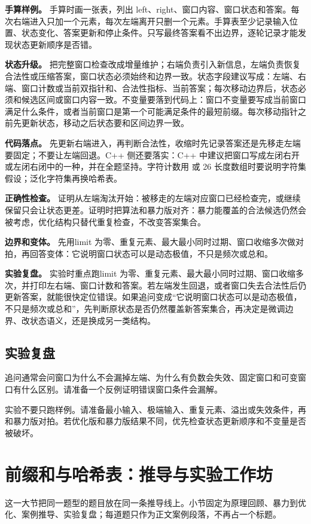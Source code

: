 \textbf{手算样例。} 手算时画一张表，列出 left、right、窗口内容、窗口状态和答案。每次右端进入只加一个元素，每次左端离开只删一个元素。手算表至少记录输入位置、状态变化、答案更新和停止条件。只写最终答案看不出边界，逐轮记录才能发现状态更新顺序是否错。

\textbf{状态升级。} 把完整窗口检查改成增量维护；右端负责引入新信息，左端负责恢复合法性或压缩答案，窗口状态必须始终和边界一致。状态字段建议写成：左端、右端、窗口计数或当前双指针和、合法性指标、当前答案；每次移动边界后，状态必须和候选区间或窗口内容一致。不变量要落到代码上：窗口不变量要写成当前窗口满足什么条件，或者当前窗口是第一个可能满足条件的最短前缀。每次移动指针之前先更新状态，移动之后状态要和区间边界一致。

\textbf{代码落点。} 先更新右端进入，再判断合法性，收缩时先记录答案还是先移走左端要固定；不要让左端回退。C++ 侧还要落实：C++ 中建议把窗口写成左闭右开或左闭右闭中的一种，并在全题坚持。字符计数用  或 26 长度数组时要说明字符集假设；泛化字符集再换哈希表。

\textbf{正确性检查。} 证明从左端淘汰开始：被移走的左端对应窗口已经检查完，或继续保留只会让状态更差。证明时把算法和暴力版对齐：暴力能覆盖的合法候选仍然会被考虑，优化结构只替代重复检查，不改变答案集合。

\textbf{边界和变体。} 先用limit 为零、重复元素、最大最小同时过期、窗口收缩多次做对拍，再回答变体：它说明窗口状态可以是动态极值，不只是频次或总和。

\textbf{实验复盘。} 实验时重点跑limit 为零、重复元素、最大最小同时过期、窗口收缩多次，并打印左右端、窗口计数和答案。若左端发生回退，或者窗口失去合法性后仍更新答案，就能很快定位错误。如果追问变成“它说明窗口状态可以是动态极值，不只是频次或总和”，先判断原状态是否仍然覆盖新答案集合，再决定是微调边界、改状态语义，还是换成另一类结构。

\subsection{实验复盘}

追问通常会问窗口为什么不会漏掉左端、为什么有负数会失效、固定窗口和可变窗口有什么区别。请准备一个反例证明错误窗口条件会漏解。

实验不要只跑样例。请准备最小输入、极端输入、重复元素、溢出或失效条件，再和暴力版对拍。若优化版和暴力版结果不同，优先检查状态更新顺序和不变量是否被破坏。

\section{前缀和与哈希表：推导与实验工作坊}
这一大节把同一题型的题目放在同一条推导线上。小节固定为原理回顾、暴力到优化、案例推导、实验复盘；每道题只作为正文案例段落，不再占一个标题。

